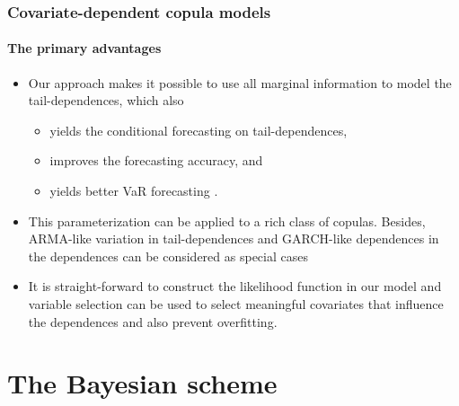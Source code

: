 \documentclass[10pt,aspectratio=169]{beamer}
\begin{document}
\begin{frame}
  \frametitle{Covariate-dependent copula models}
  \framesubtitle{The primary advantages}
  \begin{itemize}

  \item Our approach makes it possible to use all marginal information to model the
    tail-dependences, which also

    \begin{itemize}
    \item yields the conditional forecasting on tail-dependences,
    \item improves the forecasting accuracy, and
    \item yields better VaR forecasting \citep{huang2009estimating,siburg2015forecasting}.
    \end{itemize}


  \item This parameterization can be applied to a rich class of copulas. Besides,
    ARMA-like variation in tail-dependences \citep{patton2006modelling} and GARCH-like
    dependences in the dependences \citep{lucas2014conditional} can be considered as
    special cases

  \item It is straight-forward to construct the likelihood function in our model and
    variable selection can be used to select meaningful covariates that influence the
    dependences and also prevent overfitting.

  \end{itemize}
\end{frame}


\section{The Bayesian scheme}
\end{document}
